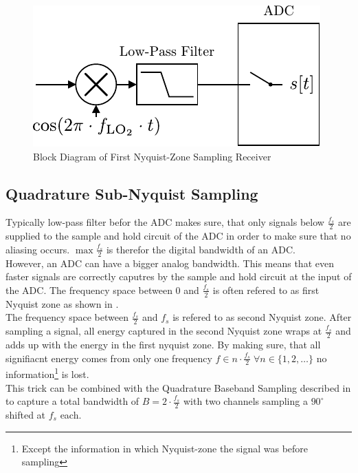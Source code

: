 \begin{figure}[h!]
  \centering
  \includegraphics[width=\textwidth]{figures/rx_adc_0_bd}
  \caption{Block Diagram of First Nyquist-Zone Sampling Receiver}
  \label{fig:rx_adc_0_bd}
\end{figure}

\subsection{Quadrature Sub-Nyquist Sampling}
\label{sec:rx_adc_2}
Typically low-pass filter befor the \gls{ADC} makes sure, that only
signals below $\frac{f_s}{2}$ are supplied to the sample and hold circuit
of the \gls{ADC} in order to make sure that no aliasing occurs.
$\max \frac{f_s}{2}$ is therefor the digital bandwidth of an \gls{ADC}. \\

However, an \gls{ADC} can have a bigger analog bandwidth. This means that
even faster signals are correctly caputres by the sample and hold circuit
at the input of the \gls{ADC}. The frequency space between 0 and
$\frac{f_s}{2}$ is often refered to as first Nyquist zone as shown in
. \\
The frequency space between $\frac{f_s}{2}$ and $f_s$ is refered to as
second Nyquist zone. After sampling a signal, all energy captured in the
second Nyquist zone wraps at $\frac{f_s}{2}$ and adds up with the energy
in the first nyquist zone. By making sure, that all signifiacnt energy
comes from only one frequency
$f \in n \cdot \frac{f_s}{2} \; \forall n \in \{1, 2, \dots\}$
no information\footnote{Except the information in which
  Nyquist-zone the signal was before sampling} is lost. \\

This trick can be combined with the Quadrature Baseband Sampling described
in  to capture a total bandwidth of
$B = 2 \cdot \frac{f_s}{2}$ with two channels sampling a $90^\circ$ shifted
at $f_s$ each. \\

